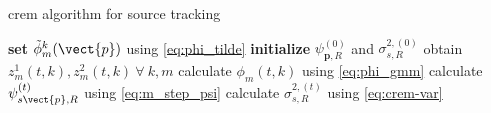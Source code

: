 \begin{algorithm}[H]
\label{alg:crem}
\caption{\acrshort{crem} algorithm for source tracking}
\begin{algorithmic}
\State \textbf{set} $\tilde\phi^k_m(\vect{p})$ using \eqref{eq:phi_tilde}
\State \textbf{initialize} $\psi_{\bm p, R}^{(0)}$ and $\sigma_{s,R}^{2,(0)}$
\State obtain $z_m^1(t,k), z_m^2(t,k)\ \forall\ k,m$
\State calculate $\phi_m(t,k)$ using \eqref{eq:phi_gmm}
\State calculate $\psi^{(t)}_{s\vect{p},R}$ using \eqref{eq:m_step_psi}
\State calculate $\sigma^{2,(t)}_{s,R}$ using \eqref{eq:crem-var}
\EndFor
\end{algorithmic}
\end{algorithm}